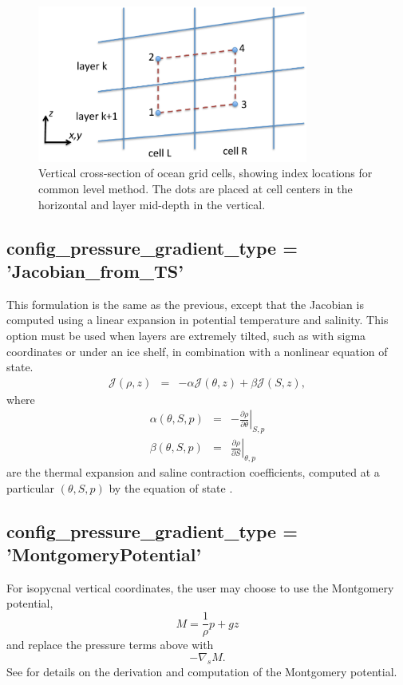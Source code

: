 \begin{figure}[htb]
\centering
\includegraphics[width=3.5in]{ocean/figures/common_level.pdf}
\caption{Vertical cross-section of ocean grid cells, showing index locations for common level method.  The dots are placed at cell centers in the horizontal and layer mid-depth in the vertical.}
\label{oceanFigure:common level}
\end{figure}

\subsection{ config\_pressure\_gradient\_type = 'Jacobian\_from\_TS'}
This formulation is the same as the previous, except that the Jacobian is computed using a linear expansion in potential temperature and salinity.  This option must be used when layers are extremely tilted, such as with sigma coordinates or under an ice shelf, in combination with a nonlinear equation of state.
\begin{eqnarray}
 {\mathcal J}(\rho,z) &=& -\alpha  {\mathcal J}(\theta,z) + \beta  {\mathcal J}(S,z), 
\end{eqnarray}
where
\begin{eqnarray}
\alpha\left( \theta, S, p\right) &=&  -\left. \frac{\partial \rho}{\partial \theta} \right|_{S,p} \\
\beta\left( \theta, S, p\right) &=&  \left. \frac{\partial \rho}{\partial S} \right|_{\theta,p} 
\end{eqnarray}
are the thermal expansion and saline contraction coefficients, computed at a particular  $\left(\theta, S, p\right)$ by the equation of state \citep[eqn 7.16]{Shchepetkin_McWilliams03jgr}.

\subsection{ config\_pressure\_gradient\_type = 'MontgomeryPotential'}
For isopycnal vertical coordinates, the user may choose to use the Montgomery potential,
\begin{equation}
\label{ocean:Montgomery Potential}
M = \frac{1}{\rho}p+gz
\end{equation}
and replace the pressure terms above with
\begin{equation}
- \nabla_s M.
\end{equation}
See \citet[section 2.1]{Higdon05jcp} for details on the derivation and computation of the Montgomery potential.

